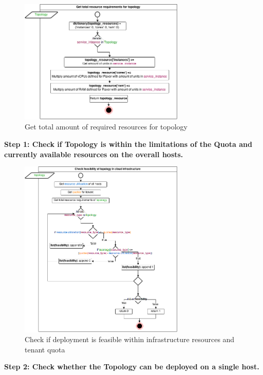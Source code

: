 \begin{figure}[H]
\centering

\includegraphics[width=0.7\textwidth]{images/design/cm_get_topology_requirements}

\caption{Get total amount of required resources for topology}
\end{figure}


\textbf{Step 1: Check if Topology is within the limitations of the Quota and currently available resources on the overall hosts.}

\begin{figure}[H]
\centering

\includegraphics[width=0.7\textwidth]{images/design/cm_feasibility_check}

\caption{Check if deployment is feasible within infrastructure resources and tenant quota}
\end{figure}


\textbf{Step 2: Check whether the Topology can be deployed on a single host.}

